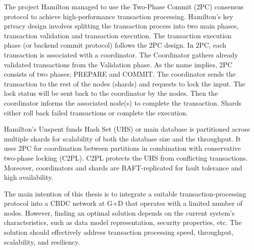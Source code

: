 \documentclass[
  english,        %
  font=times,     %
  onecolumn,      %
]{tumarticle}
\begin{document}
\hspace{1em} The project Hamilton \cite{lovejoy2023hamilton} managed to use the Two-Phase Commit (2PC) consensus protocol to achieve high-performance transaction processing. Hamilton's key privacy design involves splitting the transaction process into two main phases, transaction validation and transaction execution. The transaction execution phase (or backend commit protocol) follows the 2PC design. In 2PC, each transaction is associated with a coordinator. The Coordinator gathers already validated transactions from the Validation phase. As the name implies, 2PC consists of two phases; PREPARE and COMMIT. The coordinator sends the transaction to the rest of the nodes (shards) and requests to lock the input. The lock status will be sent back to the coordinator by the nodes. Then the coordinator informs the associated node(s) to complete the transaction. Shards either roll back failed transactions or complete the execution. 

\hspace{1em} Hamilton’s Unspent funds Hash Set (UHS) or main database is partitioned across multiple shards for scalability of both the database size and the throughput. It uses 2PC for coordination between partitions in combination with conservative two-phase locking (C2PL). C2PL protects the UHS from conflicting transactions. Moreover, coordinators and shards are RAFT-replicated for fault tolerance and high availability.

\hspace{1em} The main intention of this thesis is to integrate a suitable transaction-processing protocol into a CBDC network at G+D that operates with a limited number of nodes. However, finding an optimal solution depends on the current system's characteristics, such as data model representation, security properties, etc. The solution should effectively address transaction processing speed, throughput, scalability, and resiliency.
\end{document}
